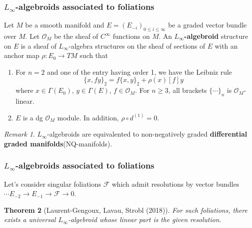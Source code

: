\documentclass{beamer}
\newtheorem{thm}{Theorem}[section]
\theoremstyle{definition}
\theoremstyle{remark}
\newtheorem{rem}[thm]{Remark}
\numberwithin{equation}{section}
\newcommand{\CF}{{\mathcal F}}
\newcommand{\CO}{{\mathcal O}}
\begin{document}
\begin{frame}\frametitle{$L_{\infty}$-algebroids associated to foliations}
	Let $M$ be a smooth manifold and $E=(E_{-i})_{0\le i\le \infty}$ be a graded vector bundle over $M$. Let $\CO_M$ be the sheaf of $C^{\infty}$ functions on $M$. An {\bf $L_{\infty}$-algebroid} structure on $E$ is a sheaf of $L_{\infty}$-algebra structures on the sheaf of sections of $E$ with an anchor map $\rho: E_{0} \to TM$ such that
	\begin{enumerate}
		\item For $n=2$ and one of the entry having order 1, we have the Leibniz rule
		\begin{equation*}
		\{x, fy \}_2=f\{x,y \}_2+\rho(x)[f]y
		\end{equation*}
		where $x\in \Gamma(E_0)$, $y\in \Gamma(E)$, $f\in \CO_M$. For $n\ge 3$, all brackets $\{\cdots \}_n$ is $\CO_M$-linear. 
		\item $E$ is a dg $\CO_M$ module. In addition, $\rho\circ d^{(1)}=0$. 
	\end{enumerate} 

\begin{rem}
	$L_{\infty}$-algebroids are equivalented to non-negatively graded {\bf differential graded manifolds}(NQ-manifolds).
\end{rem}
\end{frame}
\begin{frame}
\frametitle{$L_{\infty}$-algebroids associated to foliations}



Let's consider singular foliations $\CF$ which admit  resolutions by vector bundles $\cdots E_{-2}\to E_{-1}\to \CF \to 0$.  

\begin{thm}[Laurent-Gengoux, Lavau, Strobl (2018)]
For such foliations, there exists a {\it {universal} $L_{\infty}$}-algebroid whose linear part is the given resolution.	
\end{thm}


\end{frame}

\end{document}
